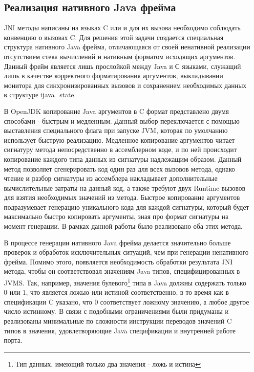 \subsection{Реализация нативного Java фрейма}
JNI методы написаны на языках C или \cpp и для их вызова необходимо соблюдать конвенцию о вызовах C. Для решения этой задачи создается специальная структура нативного Java фрейма, отличающаяся от своей ненативной реализации отсутствием стека вычислений и нативным форматом исходящих аргументов. Данный фрейм является лишь прослойкой между Java и С языками, служащий лишь в качестве корректного форматирования аргументов, выкладывании монитора для синхронизированных вызовов и сохранением необходимых данных в структуре ijava\_state.




В OpenJDK копирование Java аргументов в C формат представлено двумя способами - быстрым и медленным. Данный выбор переключается с помощью выставления специального флага при запуске JVM, которая по умолчанию использует быструю реализацию. Медленное копирование аргументов читает сигнатуру метода непосредственно в ассемблерном коде, и по ней происходит копирование каждого типа данных из сигнатуры надлежащим образом. Данный метод позволяет сгенерировать код один раз для всех вызовов метода, однако чтение и разбор сигнатуры из ассемблера накладывает дополнительные вычислительные затраты на данный код, а также требуют двух Runtime вызовов для взятия необходимых значений из метода. Быстрое копирование аргументов подразумевает генерацию уникального кода для каждой сигнатуры, который будет максимально быстро копировать аргументы, зная про формат сигнатуры на момент генерации. В рамках данной работы было реализовано оба этих метода.

В процессе генерации нативного Java фрейма делается значительно больше проверок и обработок исключительных ситуаций, чем при генерации ненативного фрейма. Помимо этого, появляется необходимость обработки результата JNI метода, чтобы он соответствовал значениям Java типов, специфицированных в JVMS. Так, например, значения булевого\footnote{Тип данных, имеющий только два значения - ложь и истина} типа в Java должны содержать только $0$ или $1$, что является ложью или истиной соответственно, в то время как в спецификации C указано, что $0$ соответствует ложному значению, а любое другое число истинному. В связи с подобными ограничениями были придуманы и реализованы минимальные по сложности инструкции переводов значений C типов в значения, удовлетворяющие Java спецификации и внутренней работе порта.


